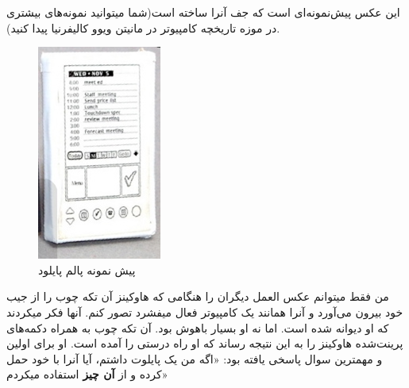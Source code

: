 این عکس پیش‌نمونه‌ای است که جف آنرا ساخته است(شما میتوانید نمونه‌های
بیشتری در موزه تاریخچه کامپیوتر در مانیتن ویوو کالیفرنیا پیدا کنید).

\begin{figure}[htbp]
\centering
\includegraphics{palmpilot.png}
\caption{پیش نمونه پالم پایلود}
\end{figure}

من فقط میتوانم عکس العمل دیگران را هنگامی که هاوکینز آن تکه چوب را از
جیب خود بیرون می‌آورد و آنرا همانند یک کامپیوتر فعال میفشرد تصور کنم.
آنها فکر میکردند که او دیوانه شده است. اما نه او بسیار باهوش بود. آن تکه
چوب به همراه دکمه‌های پرینت‌شده هاوکینز را به این نتیجه رساند که او راه
درستی را آمده است. او برای اولین و مهمترین سوال پاسخی یافته بود: «اگه من
یک پایلوت داشتم، آیا آنرا با خود حمل کرده و از \textbf{آن چیز} استفاده
میکردم»
